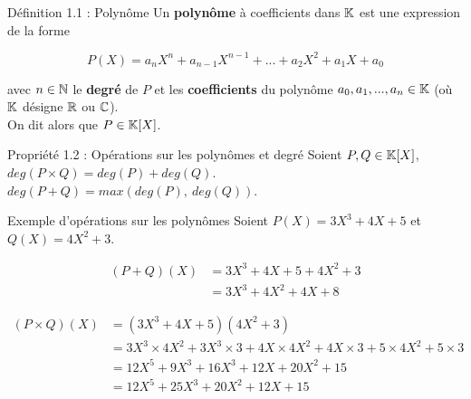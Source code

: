 \begin{theorem}[red]{Définition 1.1 : Polynôme}
    Un \textbf{polynôme} à coefficients dans $\mathbb{K}$ est une expression de la forme

    $$
        P(X) = a_nX^n + a_{n - 1}X^{n - 1} + ... + a_2X^2 + a_1X + a_0
    $$

    \noindent avec $n \in \mathbb{N}$ le \textbf{degré} de $P$ et les \textbf{coefficients} du polynôme $a_0, a_1, ..., a_n \in \mathbb{K}$ (où $\mathbb{K}$ désigne $\mathbb{R}$ ou $\mathbb{C}$). \\
    On dit alors que $P \in \mathbb{K}[X]$.
\end{theorem}

\begin{theorem}[blue]{Propriété 1.2 : Opérations sur les polynômes et degré}
    Soient $P, Q \in \mathbb{K}[X]$, \\

    \noindent $deg(P \times Q) = deg(P) + deg(Q)$. \\
    \noindent $deg(P + Q) = max(deg(P), \ deg(Q))$.
\end{theorem}

\begin{theorem}[black]{Exemple d'opérations sur les polynômes}
    Soient $P(X) = 3X^3 + 4X + 5$ et $Q(X) = 4X^2 + 3$.

    \begin{align*}
        (P + Q)(X) &= 3X^3 + 4X + 5 + 4X^2 + 3 \\
        &= 3X^3 + 4X^2 + 4X + 8
    \end{align*}

    \begin{align*}
        (P \times Q)(X) &= (3X^3 + 4X + 5)(4X^2 + 3) \\
        &= 3X^3 \times 4X^2 + 3X^3 \times 3 + 4X \times 4X^2 + 4X \times 3 + 5 \times 4X^2 + 5 \times 3 \\
        &= 12X^5 + 9X^3 + 16X^3 + 12X + 20X^2 + 15 \\
        &= 12X^5 + 25X^3 + 20X^2 + 12X + 15
    \end{align*}
\end{theorem}